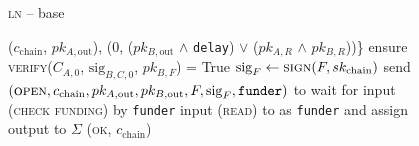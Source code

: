 \begin{figure}[H]
\begin{processbox}{\textsc{ln} -- base}
\begin{algorithmic}[1]
{          ($c_{\mathrm{chain}}$, $pk_{A, \mathrm{out}}$), ($0$, ($pk_{B,
          \mathrm{out}}$ $\wedge$ \texttt{delay}) $\vee$ ($pk_{A, R}$ $\wedge$
          $pk_{B, R}$))\}}
          \State {}
          \State {}
          \State {}
          \State {}
          \State ensure \textsc{verify}($C_{A, 0}$, $\mathrm{sig}_{B, C, 0}$,
          $pk_{B, F}$) = True
        \EndIf
        \State $\mathrm{sig}_F \gets \textsc{sign}(F, sk_{\mathrm{chain}})$
        \State send $(\textsc{open}, c_{\mathrm{chain}}, pk_{A, \mathrm{out}},
        pk_{B, \mathrm{out}}, F, \mathrm{sig}_F, \texttt{funder})$ to \adversary
          \State wait for input (\textsc{check funding}) by \texttt{funder}
          \State input (\textsc{read}) to \ledger as \texttt{funder} and assign
          output to $\Sigma$
        \EndWhile
        \State \Return (\textsc{ok}, $c_{\mathrm{chain}}$)
      \EndIndent
    \end{algorithmic}
  \end{processbox}
  \caption{}
  \label{code:ln:base}
\end{figure}

